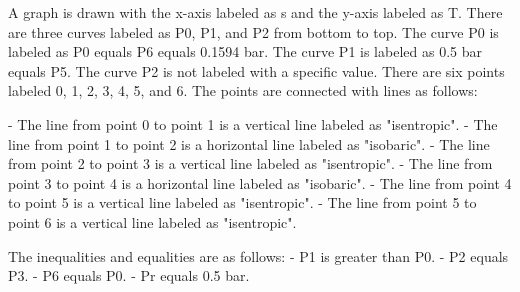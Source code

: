 A graph is drawn with the x-axis labeled as s and the y-axis labeled as T. There are three curves labeled as P0, P1, and P2 from bottom to top. The curve P0 is labeled as P0 equals P6 equals 0.1594 bar. The curve P1 is labeled as 0.5 bar equals P5. The curve P2 is not labeled with a specific value. There are six points labeled 0, 1, 2, 3, 4, 5, and 6. The points are connected with lines as follows:

- The line from point 0 to point 1 is a vertical line labeled as "isentropic".
- The line from point 1 to point 2 is a horizontal line labeled as "isobaric".
- The line from point 2 to point 3 is a vertical line labeled as "isentropic".
- The line from point 3 to point 4 is a horizontal line labeled as "isobaric".
- The line from point 4 to point 5 is a vertical line labeled as "isentropic".
- The line from point 5 to point 6 is a vertical line labeled as "isentropic".

The inequalities and equalities are as follows:
- P1 is greater than P0.
- P2 equals P3.
- P6 equals P0.
- Pr equals 0.5 bar.